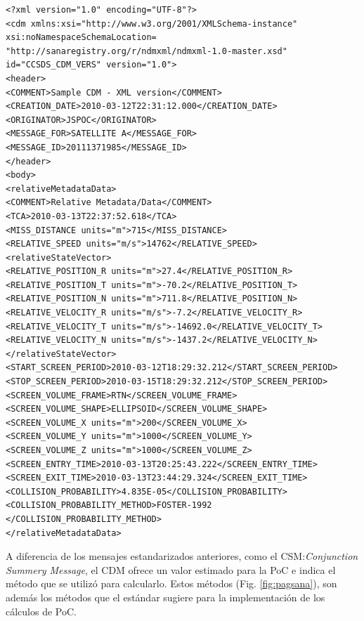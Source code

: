 \lstset{language=XML,basicstyle=\small}
\begin{lstlisting}
<?xml version="1.0" encoding="UTF-8"?>
<cdm xmlns:xsi="http://www.w3.org/2001/XMLSchema-instance"
xsi:noNamespaceSchemaLocation=
"http://sanaregistry.org/r/ndmxml/ndmxml-1.0-master.xsd"
id="CCSDS_CDM_VERS" version="1.0">
<header>
<COMMENT>Sample CDM - XML version</COMMENT>
<CREATION_DATE>2010-03-12T22:31:12.000</CREATION_DATE>
<ORIGINATOR>JSPOC</ORIGINATOR>
<MESSAGE_FOR>SATELLITE A</MESSAGE_FOR>
<MESSAGE_ID>20111371985</MESSAGE_ID>
</header>
<body>
<relativeMetadataData>
<COMMENT>Relative Metadata/Data</COMMENT>
<TCA>2010-03-13T22:37:52.618</TCA>
<MISS_DISTANCE units="m">715</MISS_DISTANCE>
<RELATIVE_SPEED units="m/s">14762</RELATIVE_SPEED>
<relativeStateVector>
<RELATIVE_POSITION_R units="m">27.4</RELATIVE_POSITION_R>
<RELATIVE_POSITION_T units="m">-70.2</RELATIVE_POSITION_T>
<RELATIVE_POSITION_N units="m">711.8</RELATIVE_POSITION_N>
<RELATIVE_VELOCITY_R units="m/s">-7.2</RELATIVE_VELOCITY_R>
<RELATIVE_VELOCITY_T units="m/s">-14692.0</RELATIVE_VELOCITY_T>
<RELATIVE_VELOCITY_N units="m/s">-1437.2</RELATIVE_VELOCITY_N>
</relativeStateVector>
<START_SCREEN_PERIOD>2010-03-12T18:29:32.212</START_SCREEN_PERIOD>
<STOP_SCREEN_PERIOD>2010-03-15T18:29:32.212</STOP_SCREEN_PERIOD>
<SCREEN_VOLUME_FRAME>RTN</SCREEN_VOLUME_FRAME>
<SCREEN_VOLUME_SHAPE>ELLIPSOID</SCREEN_VOLUME_SHAPE>
<SCREEN_VOLUME_X units="m">200</SCREEN_VOLUME_X>
<SCREEN_VOLUME_Y units="m">1000</SCREEN_VOLUME_Y>
<SCREEN_VOLUME_Z units="m">1000</SCREEN_VOLUME_Z>
<SCREEN_ENTRY_TIME>2010-03-13T20:25:43.222</SCREEN_ENTRY_TIME>
<SCREEN_EXIT_TIME>2010-03-13T23:44:29.324</SCREEN_EXIT_TIME>
<COLLISION_PROBABILITY>4.835E-05</COLLISION_PROBABILITY>
<COLLISION_PROBABILITY_METHOD>FOSTER-1992
</COLLISION_PROBABILITY_METHOD>
</relativeMetadataData>
\end{lstlisting}

A diferencia de los mensajes estandarizados anteriores, como el CSM:{\it{Conjunction Summery Message}}, el CDM ofrece un valor estimado para la PoC e indica el m\'etodo que se utiliz\'o para calcularlo. Estos m\'etodos (Fig. \ref{fig:pagsana}), son adem\'as los m\'etodos que el est\'andar sugiere para la implementaci\'on de los c\'alculos de PoC.\\

